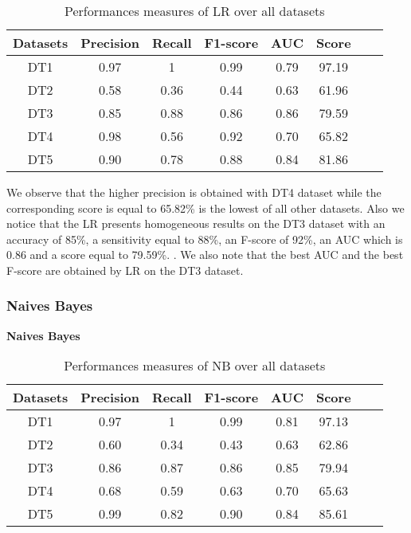 \begin{table}[!ht]
\centering
\begin{tabular}{*{6}{c}l r}
  \toprule
  \textbf{Datasets} & \textbf{Precision} & \textbf{Recall} & \textbf{F1-score}&\textbf{AUC} &\textbf{Score}\\
   \midrule
  DT1 &0.97 &1   &0.99 &0.79 &97.19 \\
  DT2 & 0.58 &0.36   &0.44&0.63&61.96\\
  DT3 &0.85 &0.88 &0.86&0.86&79.59\\
  DT4 &0.98 &0.56&0.92&0.70&65.82\\
  DT5 & 0.90&0.78&0.88&0.84&81.86\\
  
  
    \bottomrule
\end{tabular}
\caption{Performances measures of LR over all datasets}\label{perf-measure-dt1}
\end{table}
We observe that the higher precision is obtained with DT4 dataset while the corresponding score is equal to 65.82\% is the lowest of all other datasets. Also we notice that the LR presents homogeneous results on the DT3 dataset with an accuracy of 85\%, a sensitivity equal to 88\%, an F-score of 92\%, an AUC which is 0.86 and a score equal to 79.59\%. . We also note that the best AUC and the best F-score are obtained by LR on the DT3 dataset.
\subsubsection{Naives Bayes}
\begin{center}
\textbf{Naives Bayes}

\end{center}
\begin{table}[!ht]
\centering
\begin{tabular}{*{6}{c}l r}
  \toprule
  \textbf{Datasets} & \textbf{Precision} & \textbf{Recall} & \textbf{F1-score}&\textbf{AUC} &\textbf{Score}\\
   \midrule
  DT1 &0.97 &1   &0.99 &0.81 &97.13 \\
  DT2 & 0.60 &0.34   &0.43&0.63&62.86 \\
  DT3 &0.86 &0.87 &0.86&0.85&79.94\\
  DT4 &0.68 &0.59&0.63&0.70&65.63\\
  DT5 &0.99 &0.82&0.90&0.84&85.61\\
  
  
    \bottomrule
\end{tabular}
\caption{Performances measures of NB over all datasets}\label{perf-measure-dt1}
\end{table}

